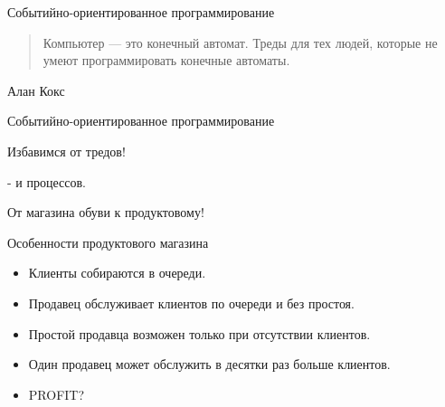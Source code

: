 \documentclass[aspectratio=169]{beamer}
\begin{document}
\begin{frame}{Событийно-ориентированное программирование}

    \begin{quote}
    Компьютер — это конечный автомат.
        Треды для тех людей, которые не умеют
        программировать конечные автоматы.
    \end{quote}
    \begin{center}
        \begin{uncoverenv}
        Алан Кокс
        \end{uncoverenv}
    \end{center}

\end{frame}

\begin{frame}{Событийно-ориентированное программирование}
    \begin{block}
        {\huge Избавимся от тредов!}
            \par - {\small и процессов.}
    \end{block}
\end{frame}


\begin{frame}{От магазина обуви к продуктовому!}
    \begin{block}{Особенности продуктового магазина}
        \begin{itemize}
            \item Клиенты собираются в очереди.
            \item Продавец обслуживает клиентов по очереди и без простоя.
            \item Простой продавца возможен только при отсутствии клиентов.
            \item Один продавец может обслужить в десятки раз больше клиентов.
            \item PROFIT?
        \end{itemize}
    \end{block}

\end{frame}
\end{document}
